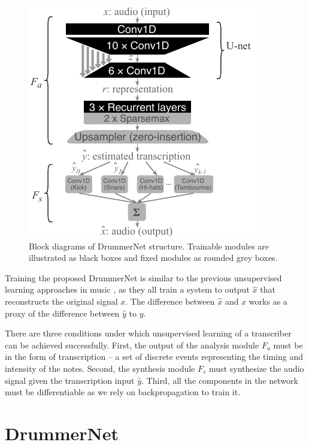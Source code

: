 \documentclass{article}
\newcommand{\squeeze}{\vspace{-0.15cm}}
\newcommand{\smallsqueeze}{\vspace{-0.1cm}}
\begin{document}
	\begin{figure}[t]
		\centering
		\includegraphics[width=\columnwidth]{drummer_net_structure_camera-ready.pdf}
		\caption{Block diagrams of DrummerNet structure. Trainable modules are illustrated as black boxes and fixed modules as rounded grey boxes.}
		\label{fig:overview}
	\end{figure}
	
	Training the proposed DrummerNet is similar to the previous unsupervised learning approaches in music \cite{abdallah2006unsupervised, yoshii2012unsupervised, berg2014unsupervised}, as they all train a system to output $\hat{x}$ that reconstructs the original signal $x$. The difference between $\hat{x}$ and $x$ works as a proxy of the difference between $\hat{y}$ to $y$.
	
	There are three conditions under which unsupervised learning of a transcriber can be achieved successfully.
	First, the output of the analysis module $F_a$ must be in the form of transcription -- a set of discrete events representing the timing and intensity of the notes. Second, the synthesis module $F_s$ must synthesize the audio signal given the transcription input $\hat{y}$.
	Third, all the components in the network must be differentiable as we rely on backpropagation to train it.
	
	\squeeze
	\section{DrummerNet}
	\label{sec:proposed_method}
	\smallsqueeze
	
\end{document}
